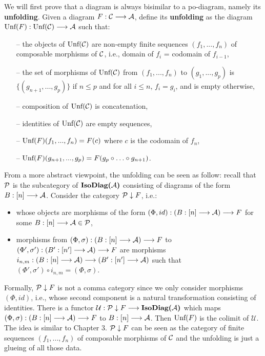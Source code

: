 We will first prove that a diagram is always bisimilar to a po-diagram, namely its \textbf{unfolding}. Given a diagram $F : \mathcal{C} \longrightarrow \mathcal{A}$, define its \textbf{unfolding} as the diagram $\text{Unf}(F) : \text{Unf}(\mathcal{C}) \longrightarrow \mathcal{A}$ such that:
\begin{itemize}
	\item[--] the objects of $\text{Unf}(\mathcal{C})$ are non-empty finite sequences $(f_1,...,f_n)$ of composable morphisms of $\mathcal{C}$, i.e., domain of $f_i$ = codomain of $f_{i-1}$,
	\item[--] the set of morphisms of $\text{Unf}(\mathcal{C})$ from $(f_1,...,f_n)$ to $(g_1,...,g_p)$ is $\{(g_{n+1},...,g_p)\}$ if $n \leq p$ and for all $i \leq n$, $f_i = g_i$, and is empty otherwise,
	\item[--] composition of $\text{Unf}(\mathcal{C})$ is concatenation,
	\item[--] identities of $\text{Unf}(\mathcal{C})$ are empty sequences,
	\item[--] $\text{Unf}(F)(f_1,...,f_n) = F(c)$ where $c$ is the codomain of $f_n$,
	\item[--] $\text{Unf}(F)(g_{n+1},...,g_p) = F(g_p\circ\ldots\circ g_{n+1})$.
\end{itemize}

From a more abstract viewpoint, the unfolding can be seen as follow: recall that $\mathcal{P}$ is the subcategory of $\textbf{IsoDiag(}\mathcal{A}\textbf{)}$ consisting of diagrams of the form $B : [n] \longrightarrow \mathcal{A}$. Consider the category $\mathcal{P}\downarrow F$, i.e.:
\begin{itemize}
	\item whose objects are morphisms of the form $(\Phi,id) : (B : [n] \longrightarrow \mathcal{A}) \longrightarrow F$ for some $B : [n] \longrightarrow \mathcal{A} \in \mathcal{P}$,
	\item morphisms from $(\Phi,\sigma) : (B : [n] \longrightarrow \mathcal{A}) \longrightarrow F$ to $(\Phi',\sigma') : (B' : [n'] \longrightarrow \mathcal{A}) \longrightarrow F$ are morphisms $i_{n,m} : (B : [n] \longrightarrow \mathcal{A}) \longrightarrow (B' : [n'] \longrightarrow \mathcal{A})$ such that $(\Phi',\sigma')\circ i_{n,m} = (\Phi,\sigma)$.
\end{itemize}
Formally, $\mathcal{P}\downarrow F$ is not a comma category since we only consider morphisms $(\Phi,id)$, i.e., whose second component is a natural transformation consisting of identities. There is a functor $\mathcal{U} : \mathcal{P}\downarrow F \longrightarrow \textbf{IsoDiag(}\mathcal{A}\textbf{)}$ which maps $(\Phi,\sigma) : (B : [n] \longrightarrow \mathcal{A}) \longrightarrow F$ to $B : [n] \longrightarrow \mathcal{A}$. Then $\text{Unf}(F)$ is the colimit of $\mathcal{U}$. The idea is similar to Chapter 3. $\mathcal{P}\downarrow F$ can be seen as the category of finite sequences $(f_1,...,f_n)$ of composable morphisms of $\mathcal{C}$ and the unfolding is just a glueing of all those data.

